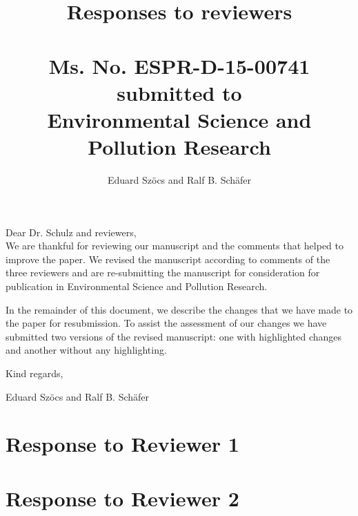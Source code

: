 \documentclass[12pt]{article}
\begin{document}
\title{Responses to reviewers\\~\\Ms. No. ESPR-D-15-00741\\submitted to\\Environmental Science and Pollution Research}

\author{Eduard Szöcs and Ralf B. Schäfer}

\maketitle
\noindent Dear Dr. Schulz  and reviewers,\\

We are thankful for reviewing our manuscript and the comments that helped to improve the paper. 
We revised the manuscript according to comments of the three reviewers and are re-submitting the manuscript for consideration for publication in Environmental Science and Pollution Research. 

In the remainder of this document, we describe the changes that we have made to the paper for resubmission. To assist the assessment of our changes we have submitted two versions of the revised manuscript: one with highlighted changes and another without any highlighting.

\vspace{2em}
\hfill Kind regards,

\hfill Eduard Szöcs and Ralf B. Schäfer

\newpage
\section{Response to Reviewer 1}


\section{Response to Reviewer 2}
\end{document}
